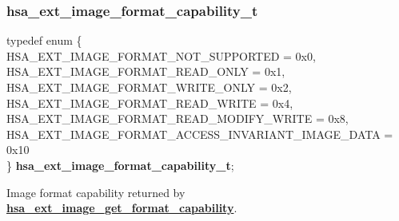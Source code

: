 \documentclass[final]{book}
\newcommand{\reffun}[1]{\textbf{#1}}
\newcommand{\reftyp}[1]{#1}
\newcommand{\refenu}[1]{\reftyp{#1}}
\newenvironment{mylongtable}{\rowcolors{0}{lightgray}{lightgray}\longtable} {
\endlongtable}
\begin{document}
\subsubsection{hsa_\-ext_\-image_\-format_\-capability_\-t}
\vspace{-5.5mm}\begin{mylongtable}{@{}p{\textwidth}}
\rule{0pt}{3ex}typedef enum \{\\\hspace{1.7em}\hypertarget{group__ext-images_1ggaef83852ae5fb54b82317e96990da388aaae6fb99314cf823319737bd5b622a2f4}{\refenu{HSA_\-EXT_\-IMAGE_\-FORMAT_\-NOT_\-SUPPORTED}} = 0x0,\\
\hspace{1.7em}\hypertarget{group__ext-images_1ggaef83852ae5fb54b82317e96990da388aa3db3e90538f1fd5a45d7937f9c881b2a}{\refenu{HSA_\-EXT_\-IMAGE_\-FORMAT_\-READ_\-ONLY}} = 0x1,\\
\hspace{1.7em}\hypertarget{group__ext-images_1ggaef83852ae5fb54b82317e96990da388aa489215daa4de11d09f2d3c1c8c212fcb}{\refenu{HSA_\-EXT_\-IMAGE_\-FORMAT_\-WRITE_\-ONLY}} = 0x2,\\
\hspace{1.7em}\hypertarget{group__ext-images_1ggaef83852ae5fb54b82317e96990da388aaf88802f6e05d969561eccbb0a3f39222}{\refenu{HSA_\-EXT_\-IMAGE_\-FORMAT_\-READ_\-WRITE}} = 0x4,\\
\hspace{1.7em}\hypertarget{group__ext-images_1ggaef83852ae5fb54b82317e96990da388aa852e4523bdab4f798240af94cc06aa65}{\refenu{HSA_\-EXT_\-IMAGE_\-FORMAT_\-READ_\-MODIFY_\-WRITE}} = 0x8,\\
\hspace{1.7em}\hypertarget{group__ext-images_1ggaef83852ae5fb54b82317e96990da388aa286344b2349f73e9f92400f589a05f60}{\refenu{HSA_\-EXT_\-IMAGE_\-FORMAT_\-ACCESS_\-INVARIANT_\-IMAGE_\-DATA}} = 0x10\\
\} \hypertarget{group__ext-images_1gaef83852ae5fb54b82317e96990da388a}{\textbf{hsa_\-ext_\-image_\-format_\-capability_\-t}};\rule[-2ex]{0pt}{0pt}\end{mylongtable}
\vspace{-2mm}Image format capability returned by \hyperlink{group__ext-images_1ga7911f56b1bc354c47fde409ace04590c}{\reffun{hsa_\-ext_\-image_\-get_\-format_\-capability}}.
\end{document}

